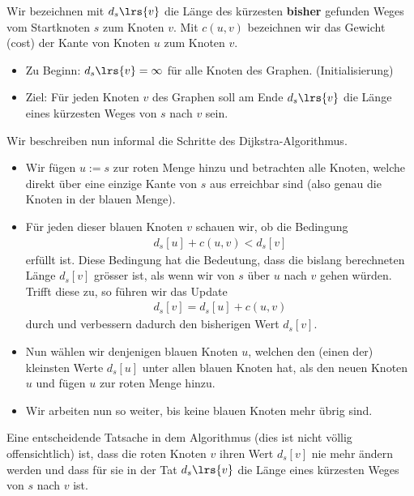 \noindent
Wir bezeichnen mit $d_s\lrs{v}$ die Länge des kürzesten \textbf{bisher} gefunden Weges vom Startknoten $s$ zum Knoten $v$. Mit $c(u,v)$ bezeichnen wir das Gewicht (cost) der Kante von Knoten $u$ zum Knoten $v$.
\begin{itemize}
    \item Zu Beginn: $d_s\lrs{v} = \infty$ für alle Knoten des Graphen. (Initialisierung)
    \item Ziel: Für jeden Knoten $v$ des Graphen soll am Ende $d_s\lrs{v}$ die Länge eines kürzesten Weges von $s$ nach $v$ sein.
\end{itemize}

\noindent
Wir beschreiben nun informal die Schritte des Dijkstra-Algorithmus.
\begin{itemize}
    \item Wir fügen $u:=s$ zur roten Menge hinzu und betrachten alle Knoten, welche direkt über eine einzige Kante von $s$ aus erreichbar sind (also genau die Knoten in der blauen Menge).
    \item Für jeden dieser blauen Knoten $v$ schauen wir, ob die Bedingung
    \begin{align*}
        d_s[u] + c(u,v) < d_s[v]
    \end{align*}
    erfüllt ist. Diese Bedingung hat die Bedeutung, dass die bislang berechneten Länge $d_s[v]$ grösser ist, als wenn wir von $s$ über $u$ nach $v$ gehen würden. Trifft diese zu, so führen wir das Update
    \begin{align*}
        d_s[v] = d_s[u] + c(u,v)
    \end{align*}
    durch und verbessern dadurch den bisherigen Wert $d_s[v]$.
    \item Nun wählen wir denjenigen blauen Knoten $u$, welchen den (einen der) kleinsten Werte $d_s[u]$ unter allen blauen Knoten hat, als den neuen Knoten $u$ und fügen $u$ zur roten Menge hinzu.
    \item Wir arbeiten nun so weiter, bis keine blauen Knoten mehr übrig sind.
\end{itemize}
Eine entscheidende Tatsache in dem Algorithmus (dies ist nicht völlig offensichtlich) ist, dass die roten Knoten $v$ ihren Wert $d_s[v]$ nie mehr ändern werden und dass für sie in der Tat  $d_s\lrs{v}$ die Länge eines kürzesten Weges von $s$ nach $v$ ist.


